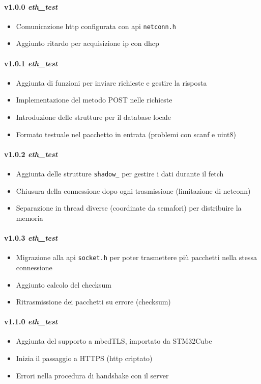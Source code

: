 \paragraph{v1.0.0 \textit{eth\_test}}
	\begin{itemize}
		\item Comunicazione http configurata con api \texttt{netconn.h}
		\item Aggiunto ritardo per acquisizione ip con dhcp
	\end{itemize}
\paragraph{v1.0.1 \textit{eth\_test}}
	\begin{itemize}
		\item Aggiunta di funzioni per inviare richieste e gestire la risposta
		\item Implementazione del metodo POST nelle richieste
		\item Introduzione delle strutture per il database locale
		\item Formato testuale nel pacchetto in entrata (problemi con scanf e uint8)
	\end{itemize}
\paragraph{v1.0.2 \textit{eth\_test}}
	\begin{itemize}
		\item Aggiunta delle strutture \texttt{shadow\_} per gestire i dati durante il fetch
		\item Chiusura della connessione dopo ogni trasmissione (limitazione di netconn)
		\item Separazione in thread diverse (coordinate da semafori) per distribuire la memoria
	\end{itemize}
\paragraph{v1.0.3 \textit{eth\_test}}
	\begin{itemize}
		\item Migrazione alla api \texttt{socket.h} per poter trasmettere pi\`{u} pacchetti nella stessa connessione
		\item Aggiunto calcolo del checksum 
		\item Ritrasmissione dei pacchetti su errore (checksum)
	\end{itemize}
\paragraph{v1.1.0 \textit{eth\_test}}
	\begin{itemize}
		\item Aggiunta del supporto a mbedTLS, importato da STM32Cube
		\item Inizia il passaggio a HTTPS (http criptato)
		\item Errori nella procedura di handshake con il server
	\end{itemize}

